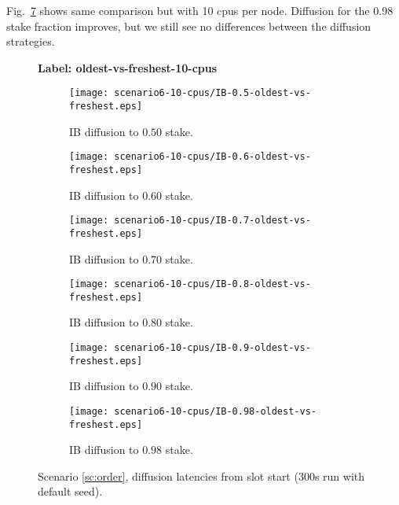 \documentclass[11pt,a4paper]{article}
\newcommand{\debug}[1]{#1}
\begin{document}
Fig.~\ref{fig:oldest-vs-freshest-10-cpus} shows same comparison but with 10 cpus per node. Diffusion for the 0.98 stake fraction improves, but we still see no differences between the diffusion strategies.
\begin{figure}[htbp]
    \centering
    \debug{\textbf{Label: oldest-vs-freshest-10-cpus} \\}
    \begin{subfigure}[b]{0.45\textwidth}
        \centering
        \texttt{[image: scenario6-10-cpus/IB-0.5-oldest-vs-freshest.eps]}
        \caption{IB diffusion to $0.50$ stake.}
        \label{fig:oldest-vs-freshest-10-cpus:ib0.5}
    \end{subfigure}
    \hfill
    \begin{subfigure}[b]{0.45\textwidth}
        \centering
        \texttt{[image: scenario6-10-cpus/IB-0.6-oldest-vs-freshest.eps]}
        \caption{IB diffusion to $0.60$ stake.}
        \label{fig:oldest-vs-freshest-10-cpus:ib0.6}
    \end{subfigure}

    \vspace{1em}

    \begin{subfigure}[b]{0.45\textwidth}
        \centering
        \texttt{[image: scenario6-10-cpus/IB-0.7-oldest-vs-freshest.eps]}
        \caption{IB diffusion to $0.70$ stake.}
        \label{fig:oldest-vs-freshest-10-cpus:ib0.7}
    \end{subfigure}
    \hfill
    \begin{subfigure}[b]{0.45\textwidth}
        \centering
        \texttt{[image: scenario6-10-cpus/IB-0.8-oldest-vs-freshest.eps]}
        \caption{IB diffusion to $0.80$ stake.}
        \label{fig:oldest-vs-freshest-10-cpus:ib0.8}
    \end{subfigure}

    \vspace{1em}

    \begin{subfigure}[b]{0.45\textwidth}
        \centering
        \texttt{[image: scenario6-10-cpus/IB-0.9-oldest-vs-freshest.eps]}
        \caption{IB diffusion to $0.90$ stake.}
        \label{fig:oldest-vs-freshest-10-cpus:ib0.9}
    \end{subfigure}
    \hfill
    \begin{subfigure}[b]{0.45\textwidth}
        \centering
        \texttt{[image: scenario6-10-cpus/IB-0.98-oldest-vs-freshest.eps]}
        \caption{IB diffusion to $0.98$ stake.}
        \label{fig:oldest-vs-freshest-10-cpus:ib0.98}
    \end{subfigure}

    \caption{Scenario \ref{sc:order}, diffusion latencies from slot start (300s run with default seed).}
    \label{fig:oldest-vs-freshest-10-cpus}
\end{figure}



\end{document}
